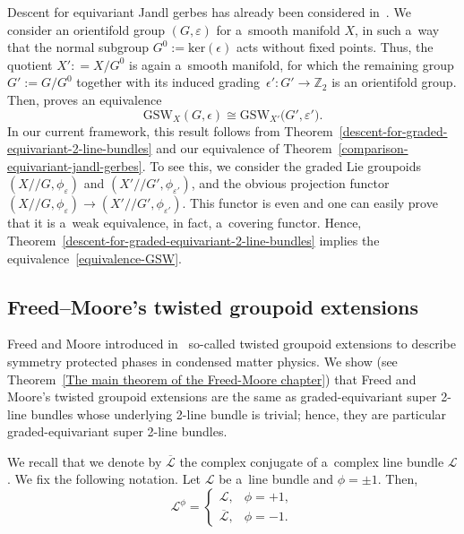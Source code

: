 \documentclass[pdftex]{sigma}
\numberwithin{equation}{section}
\def\Z {\mathbb{Z}}
\def\act#1#2{#1/\!\!/#2}
\begin{document}
\begin{Remark}
Descent for equivariant Jandl gerbes has already been considered in~\cite{gawedzki8}.
We consider an orientifold group $(G,\varepsilon)$ for a~smooth manifold $X$, in such a~way that the normal subgroup $G^{0}:=\mathrm{ker}(\epsilon)$ acts without fixed points. Thus, the quotient $X': =X/G^{0}$ is again a~smooth manifold, for which the remaining group $G':=G/G^{0}$ together with its induced grading~${\epsilon'\colon G' \to \Z_2}$ is an orientifold group. Then, \cite[Theorem~3.1]{gawedzki8} proves an equivalence
\begin{equation}
\label{equivalence-GSW}
\mathrm{GSW}_X(G,\epsilon)\cong \mathrm{GSW}_{X'}\bigl(G',\varepsilon'\bigr).
\end{equation}
In our current framework, this result follows from Theorem~\ref{descent-for-graded-equivariant-2-line-bundles} and our equivalence of Theorem~\ref{comparison-equivariant-jandl-gerbes}.
To see this, we consider the graded Lie groupoids $(\act XG,\phi_\varepsilon)$ and $(\act {X'}{G'},\phi_{\varepsilon'})$, and the obvious projection functor
$
(\act XG,\phi_\varepsilon) \to (\act {X'}{G'},\phi_{\varepsilon'})$.
This functor is even and one can easily prove that it is a~weak equivalence, in fact, a~covering functor. Hence, Theorem~\ref{descent-for-graded-equivariant-2-line-bundles} implies the equivalence~\eqref{equivalence-GSW}. \end{Remark}


\subsection{Freed--Moore's twisted groupoid extensions}
\label{freed-moore-extensions}


Freed and Moore introduced in~\cite{Freeda} so-called twisted groupoid extensions to describe symmetry protected phases in condensed matter physics.
We show (see Theorem~\ref{The main theorem of the Freed-Moore chapter}) that Freed and Moore's twisted groupoid extensions are the same as
graded-equivariant super 2-line bundles whose underlying 2-line bundle is trivial; hence, they are particular graded-equivariant super 2-line bundles.

We recall that we denote by $\overline{\mathcal{L}}$ the complex conjugate of a~complex line bundle $\mathcal{L}$.
We fix the following notation. Let $\mathcal{L}$ be a~line bundle and $\phi=\pm 1$. Then,
\begin{equation} \label{complex conjugation according to sign}
 \mathcal{L}^\phi = \begin{cases}
 \mathcal{L}, & \phi = +1, \\
 \overline{\mathcal{L}}, & \phi = -1.
 \end{cases}
\end{equation}
\end{document}
